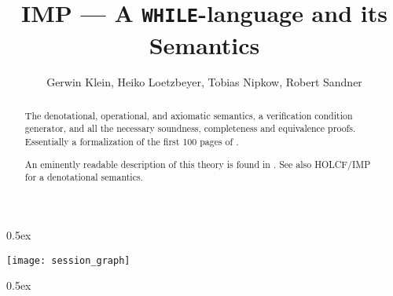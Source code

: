 \documentclass[a4wide]{article}
\begin{document}
\title{IMP --- A {\tt WHILE}-language and its Semantics}
\author{Gerwin Klein, Heiko Loetzbeyer, Tobias Nipkow, Robert Sandner}
\maketitle

\parindent 0pt\parskip 0.5ex

\begin{abstract}\noindent
  The denotational, operational, and axiomatic semantics, a verification
  condition generator, and all the necessary soundness, completeness and
  equivalence proofs. Essentially a formalization of the first 100 pages of
  \cite{Winskel}.
  
  An eminently readable description of this theory is found in \cite{Nipkow}.
  See also HOLCF/IMP for a denotational semantics.
\end{abstract}

\tableofcontents

\begin{center}
  \texttt{[image: session\_graph]}
\end{center}

\parindent 0pt\parskip 0.5ex




\end{document}
